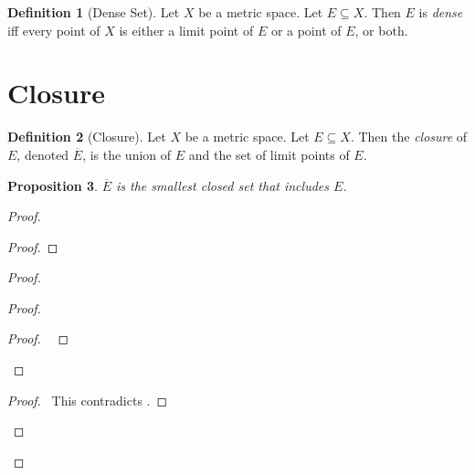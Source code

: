 \documentclass{book}
\let\qed\relax
\newtheorem{prop}{Proposition}[chapter]
\theoremstyle{definition}
\newtheorem{df}[prop]{Definition}
\begin{document}
\begin{df}[Dense Set]
Let $X$ be a metric space. Let $E \subseteq X$. Then $E$ is \emph{dense} iff every point of $X$ is either a limit point of $E$ or a point of $E$, or both.
\end{df}

\section{Closure}

\begin{df}[Closure]
Let $X$ be a metric space. Let $E \subseteq X$. Then the \emph{closure} of $E$, denoted $\overline{E}$, is the union of $E$ and the set of limit points of $E$.
\end{df}

\begin{prop}
$\overline{E}$ is the smallest closed set that includes $E$.
\end{prop}

\begin{proof}
\pf
{}
\begin{proof}
\end{proof}
\begin{proof}
	\begin{proof}
		\begin{proof}
			\pf\ 
		\end{proof}
	\end{proof}
	\qedstep
	\begin{proof}
		\pf\ This contradicts .
	\end{proof}
\end{proof}
\qed
\end{proof}
\end{document}
